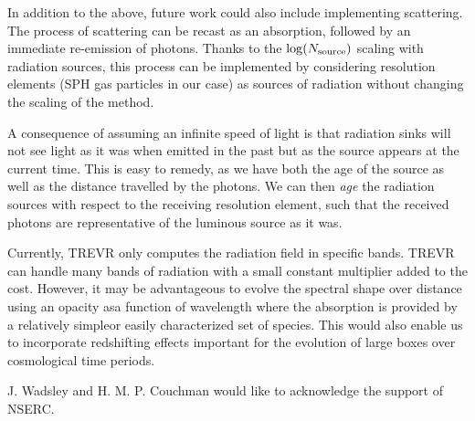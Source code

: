 \documentclass[fleq,usenatbib]{mnras}
\newcommand{\acro}{TREVR}
\newcommand{\NS}{N_{\rm source}}
\begin{document}
{In addition to the above, future work could also include implementing 
scattering.  The process of scattering can be recast as an absorption, 
followed by an immediate re-emission of photons. Thanks to the $\log(\NS)$ 
scaling with radiation sources, this process can be implemented by considering 
resolution elements (SPH gas particles in our case) as sources of radiation 
without changing the scaling of the method.

A consequence of assuming an infinite speed of light is that radiation sinks 
will not see light as it was when emitted in the past but as the source appears
at the current time.  This is easy to remedy, as we have both the age of the 
source as well as the distance travelled by the photons. We can then 
\textit{age} the radiation sources with respect to the receiving resolution 
element, such that the received photons are representative of the luminous 
source as it was.

Currently, \acro{} only computes the radiation field in specific bands. 
\acro{} can handle many bands of radiation with a small constant multiplier 
added to the cost.  However, it may be advantageous to evolve the spectral 
shape over distance using an opacity asa function of wavelength where the 
absorption is provided by a relatively simpleor easily characterized set of 
species. This would also enable us to incorporate redshifting effects 
important for the evolution of large boxes over cosmological time periods.

J. Wadsley and H. M. P. Couchman would like to acknowledge the support of 
NSERC.







\appendix
}
\end{document}
